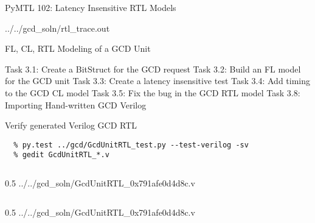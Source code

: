 \begin{frame}{PyMTL 102: Latency Insensitive RTL Models}

\vspace{-0.15in}
%
{../../gcd_soln/rtl_trace.out}

\end{frame}


\begin{frame}{ FL, CL, RTL Modeling of a GCD Unit}
\begin{cbxlist}
  \1 Task 3.1: Create a BitStruct for the GCD request
  \1 Task 3.2: Build an FL model for the GCD unit
  \1 Task 3.3: Create a latency insensitive test
  \1 Task 3.4: Add timing to the GCD CL model
  \1 Task 3.5: Fix the bug in the GCD RTL model
  \1 
  \1 
  \1 Task 3.8: Importing Hand-written GCD Verilog
\end{cbxlist}
\end{frame}

\begin{task}\begin{frame}[fragile]{Verify generated Verilog GCD RTL}

\vspace{-0.15in}
\begin{Verbatim}[commandchars=\\\{\}]
  % cd \midtilde/pymtl-tut/build
  % py.test ../gcd/GcdUnitRTL_test.py --test-verilog -sv
  % gedit GcdUnitRTL_*.v
\end{Verbatim}

\vspace{-0.1in}
\begin{cbxcols}
\begin{column}{0.5\tw}
%
{../../gcd_soln/GcdUnitRTL_0x791afe0d4d8c.v}
\end{column}
\begin{column}{0.5\tw}
%
{../../gcd_soln/GcdUnitRTL_0x791afe0d4d8c.v}
\end{column}
\end{cbxcols}

\end{frame}
\end{task}

